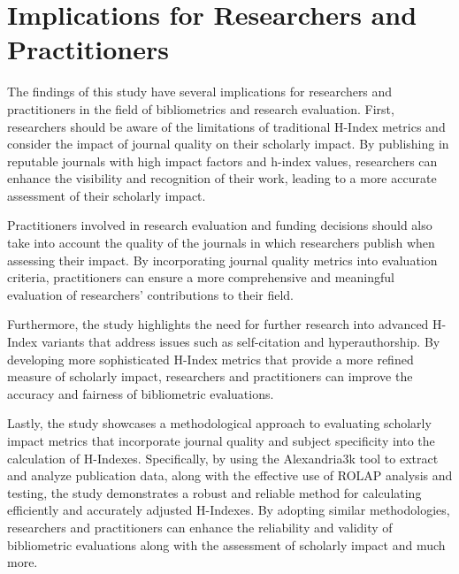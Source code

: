 \section{Implications for Researchers and Practitioners}

The findings of this study have several implications for researchers and
practitioners in the field of bibliometrics and research evaluation. First,
researchers should be aware of the limitations of traditional H-Index metrics
and consider the impact of journal quality on their scholarly impact. By
publishing in reputable journals with high impact factors and h-index values,
researchers can enhance the visibility and recognition of their work, leading
to a more accurate assessment of their scholarly impact.

Practitioners involved in research evaluation and funding decisions should also
take into account the quality of the journals in which researchers publish when
assessing their impact. By incorporating journal quality metrics into
evaluation criteria, practitioners can ensure a more comprehensive and
meaningful evaluation of researchers' contributions to their field.

Furthermore, the study highlights the need for further research into advanced
H-Index variants that address issues such as self-citation and hyperauthorship.
By developing more sophisticated H-Index metrics that provide a more refined
measure of scholarly impact, researchers and practitioners can improve the
accuracy and fairness of bibliometric evaluations.

Lastly, the study showcases a methodological approach to evaluating scholarly
impact metrics that incorporate journal quality and subject specificity into
the calculation of H-Indexes. Specifically, by using the Alexandria3k tool to
extract and analyze publication data, along with the effective use of ROLAP
analysis and testing, the study demonstrates a robust and reliable method for
calculating efficiently and accurately adjusted H-Indexes. By adopting similar
methodologies, researchers and practitioners can enhance the reliability and
validity of bibliometric evaluations along with the assessment of scholarly
impact and much more.


